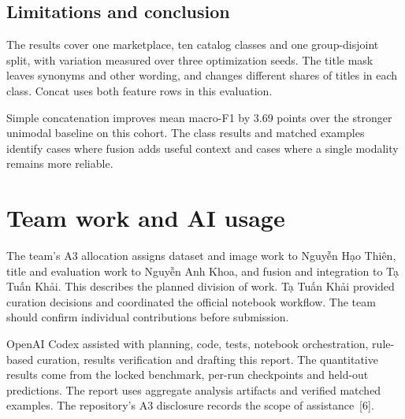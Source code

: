 \documentclass[final]{hcmut-report}
\newcommand{\vn}[1]{{\VietnameseNames #1}}
\begin{document}
\subsection{Limitations and conclusion}
The results cover one marketplace, ten catalog classes and one group-disjoint split, with variation measured over three optimization seeds. The title mask leaves synonyms and other wording, and changes different shares of titles in each class. Concat uses both feature rows in this evaluation.

Simple concatenation improves mean macro-F1 by 3.69 points over the stronger unimodal baseline on this cohort. The class results and matched examples identify cases where fusion adds useful context and cases where a single modality remains more reliable.

\clearpage
\section{Team work and AI usage}
The team's A3 allocation assigns dataset and image work to \vn{Nguyễn Hạo Thiên}, title and evaluation work to \vn{Nguyễn Anh Khoa}, and fusion and integration to \vn{Tạ Tuấn Khải}. This describes the planned division of work. \vn{Tạ Tuấn Khải} provided curation decisions and coordinated the official notebook workflow. The team should confirm individual contributions before submission.

OpenAI Codex assisted with planning, code, tests, notebook orchestration, rule-based curation, results verification and drafting this report. The quantitative results come from the locked benchmark, per-run checkpoints and held-out predictions. The report uses aggregate analysis artifacts and verified matched examples. The repository's A3 disclosure records the scope of assistance~[6].
\end{document}
